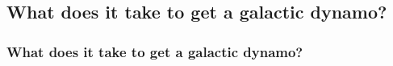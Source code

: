 \documentclass{beamer}
\begin{document}
  \subsection{What does it take to get a galactic dynamo?} 
    \begin{frame}
      \frametitle{What does it take to get a galactic dynamo?}
    \begin{columns}
      \begin{column}[]{6.0cm}
  

\end{column}
\end{columns}
\end{frame}
\end{document}
